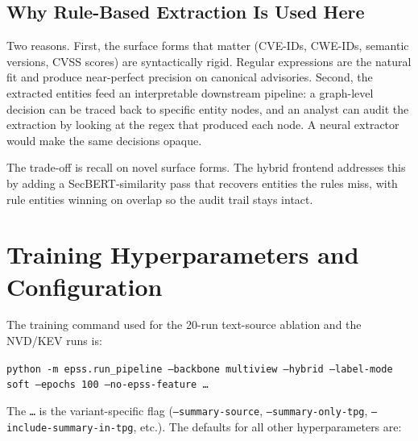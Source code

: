 \documentclass[11pt]{article}
\begin{document}
\subsection{Why Rule-Based Extraction Is Used Here}

Two reasons. First, the surface forms that matter (CVE-IDs, CWE-IDs,
semantic versions, CVSS scores) are syntactically rigid. Regular
expressions are the natural fit and produce near-perfect precision on
canonical advisories. Second, the extracted entities feed an
interpretable downstream pipeline: a graph-level decision can be
traced back to specific entity nodes, and an analyst can audit the
extraction by looking at the regex that produced each node. A
neural extractor would make the same decisions opaque.

The trade-off is recall on novel surface forms. The hybrid frontend
addresses this by adding a SecBERT-similarity pass that recovers
entities the rules miss, with rule entities winning on overlap so the
audit trail stays intact.

\section{Training Hyperparameters and Configuration}

The training command used for the 20-run text-source ablation and the
NVD/KEV runs is:

\begin{center}
\texttt{python -m epss.run\_pipeline --backbone multiview --hybrid --label-mode soft --epochs 100 --no-epss-feature \dots}
\end{center}

The \texttt{\dots} is the variant-specific flag (\texttt{--summary-source},
\texttt{--summary-only-tpg}, \texttt{--include-summary-in-tpg}, etc.).
The defaults for all other hyperparameters are:
\end{document}
